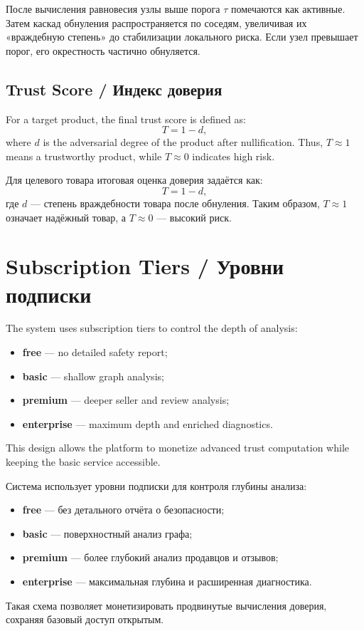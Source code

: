 \documentclass[12pt,a4paper]{article}
\begin{document}
После вычисления равновесия узлы выше порога $\tau$ помечаются как активные. Затем каскад обнуления распространяется по соседям, увеличивая их «враждебную степень» до стабилизации локального риска. Если узел превышает порог, его окрестность частично обнуляется.

\subsection{Trust Score / Индекс доверия}

For a target product, the final trust score is defined as:
\[
T = 1 - d,
\]
where $d$ is the adversarial degree of the product after nullification. Thus, $T \approx 1$ means a trustworthy product, while $T \approx 0$ indicates high risk.

Для целевого товара итоговая оценка доверия задаётся как:
\[
T = 1 - d,
\]
где $d$ — степень враждебности товара после обнуления. Таким образом, $T \approx 1$ означает надёжный товар, а $T \approx 0$ — высокий риск.

\section{Subscription Tiers / Уровни подписки}

The system uses subscription tiers to control the depth of analysis:
\begin{itemize}
    \item \textbf{free} — no detailed safety report;
    \item \textbf{basic} — shallow graph analysis;
    \item \textbf{premium} — deeper seller and review analysis;
    \item \textbf{enterprise} — maximum depth and enriched diagnostics.
\end{itemize}
This design allows the platform to monetize advanced trust computation while keeping the basic service accessible.

Система использует уровни подписки для контроля глубины анализа:
\begin{itemize}
    \item \textbf{free} — без детального отчёта о безопасности;
    \item \textbf{basic} — поверхностный анализ графа;
    \item \textbf{premium} — более глубокий анализ продавцов и отзывов;
    \item \textbf{enterprise} — максимальная глубина и расширенная диагностика.
\end{itemize}
Такая схема позволяет монетизировать продвинутые вычисления доверия, сохраняя базовый доступ открытым.
\end{document}
